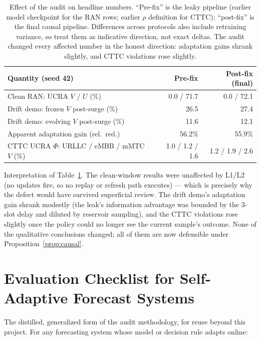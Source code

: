 \begin{table}[!t]
\caption{Effect of the audit on headline numbers. ``Pre-fix'' is the
leaky pipeline (earlier model checkpoint for the RAN rows; earlier
$\rho$ definition for CTTC); ``post-fix'' is the final causal
pipeline. Differences across protocols also include retraining
variance, so treat them as indicative direction, not exact deltas.
The audit changed every affected number in the honest direction:
adaptation gains shrank slightly, and CTTC violations rose
slightly.}
\label{tab:audit-numbers}
\centering
\small
\setlength{\tabcolsep}{4pt}
\begin{tabular}{@{}lrr@{}}
\toprule
Quantity (seed 42) & Pre-fix & Post-fix (final) \\
\midrule
Clean RAN: UCRA $V$ / $U$ (\%) & 0.0 / 71.7 & 0.0 / 72.1 \\
Drift demo: frozen $V$ post-surge (\%) & 26.5 & 27.4 \\
Drift demo: evolving $V$ post-surge (\%) & 11.6 & 12.1 \\
Apparent adaptation gain (rel.\ red.) & 56.2\% & 55.9\% \\
CTTC UCRA $\Phi$: URLLC / eMBB / mMTC $V$ (\%) & 1.0 / 1.2 / 1.6 & 1.2 / 1.9 / 2.6 \\
\bottomrule
\end{tabular}
\end{table}

Interpretation of Table~\ref{tab:audit-numbers}. The clean-window
results were unaffected by L1/L2 (no updates fire, so no replay or
refresh path executes) --- which is precisely why the defect would
have survived superficial review. The drift demo's adaptation gain
shrank modestly (the leak's information advantage was bounded by the
3-slot delay and diluted by reservoir sampling), and the CTTC
violations rose slightly once the policy could no longer see the
current sample's outcome. None of the qualitative conclusions
changed; all of them are now defensible under
Proposition~\ref{prop:causal}.

\section{Evaluation Checklist for Self-Adaptive Forecast Systems}
\label{app:checklist}

The distilled, generalized form of the audit methodology, for reuse
beyond this project. For any forecasting system whose model or
decision rule adapts online:

